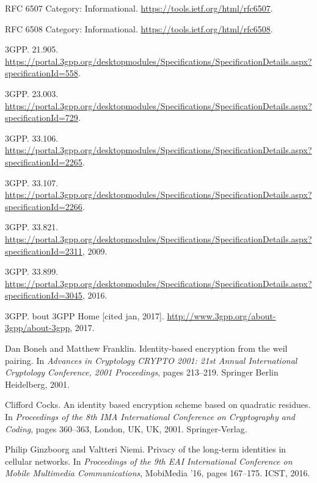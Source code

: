 \documentclass{river-journal}
\begin{document}
\begin{thebibliography}{10}

{RFC} 6507 {C}ategory: {I}nformational.
\newblock \url{https://tools.ietf.org/html/rfc6507}.

{RFC} 6508 {C}ategory: {I}nformational.
\newblock \url{https://tools.ietf.org/html/rfc6508}.

3GPP.
 21.905.
\newblock
  \url{https://portal.3gpp.org/desktopmodules/Specifications/SpecificationDetails.aspx?specificationId=558}.

3GPP.
 23.003.
\newblock
  \url{https://portal.3gpp.org/desktopmodules/Specifications/SpecificationDetails.aspx?specificationId=729}.

3GPP.
 33.106.
\newblock
  \url{https://portal.3gpp.org/desktopmodules/Specifications/SpecificationDetails.aspx?specificationId=2265}.

3GPP.
 33.107.
\newblock
  \url{https://portal.3gpp.org/desktopmodules/Specifications/SpecificationDetails.aspx?specificationId=2266}.

3GPP.
 33.821.
\newblock
  \url{https://portal.3gpp.org/desktopmodules/Specifications/SpecificationDetails.aspx?specificationId=2311},
  2009.

3GPP.
 33.899.
\newblock
  \url{https://portal.3gpp.org/desktopmodules/Specifications/SpecificationDetails.aspx?specificationId=3045},
  2016.

3GPP.
bout {3GPP} {H}ome [cited jan, 2017].
\newblock \url{http://www.3gpp.org/about-3gpp/about-3gpp}, 2017.

Dan Boneh and Matthew Franklin.
\newblock Identity-based encryption from the weil pairing.
\newblock In {\em Advances in Cryptology CRYPTO 2001: 21st Annual International
  Cryptology Conference, 2001 Proceedings}, pages 213--219. Springer Berlin
  Heidelberg, 2001.

Clifford Cocks.
\newblock An identity based encryption scheme based on quadratic residues.
\newblock In {\em Proceedings of the 8th IMA International Conference on
  Cryptography and Coding}, pages 360--363, London, UK, UK, 2001.
  Springer-Verlag.

Philip Ginzboorg and Valtteri Niemi.
\newblock Privacy of the long-term identities in cellular networks.
\newblock In {\em Proceedings of the 9th EAI International Conference on Mobile
  Multimedia Communications}, MobiMedia '16, pages 167--175. ICST, 2016.


\end{thebibliography}
\end{document}
